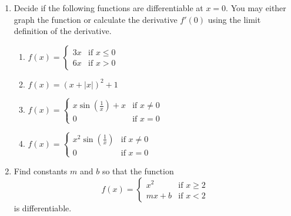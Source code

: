 \documentclass[11pt]{article}
\begin{document}
\drawtitle
\begin{enumerate}

\item Decide if the following functions are differentiable at $x=0$.
  You may either graph the function or calculate the derivative
  $f'(0)$ using the limit definition of the derivative.
  \begin{enumerate}
  \item $\displaystyle f(x) = \begin{cases} 3x &\mbox{if } x\leq 0\\
      6x &\mbox{if } x > 0 \end{cases}$
    \vfill
  \item $f(x) = (x + |x|)^2 + 1$
    \vfill
  \item $\displaystyle f(x) = \begin{cases} x\sin\left(\frac{1}{x}\right) + x &\mbox{if } x\neq 0\\
      0 &\mbox{if } x = 0 \end{cases}$
    \vfill
  \item $\displaystyle f(x) = \begin{cases} x^2\sin\left(\frac{1}{x}\right) &\mbox{if } x\neq 0\\
      0 &\mbox{if } x = 0 \end{cases}$
    \vfill
  \end{enumerate}

\newpage

\item Find constants $m$ and $b$ so that the function
  \[
  f(x) = \begin{cases} x^2 &\mbox{if } x\geq 2\\
    mx+b &\mbox{if } x < 2 \end{cases}
  \]
  is differentiable.
\end{enumerate}
\end{document}
